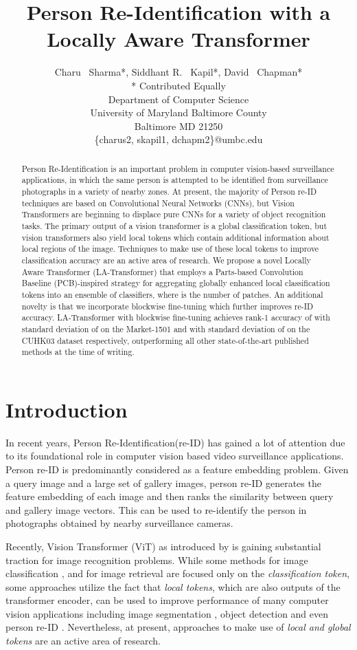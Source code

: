 \documentclass{article}
\title{Person Re-Identification with a Locally Aware Transformer}
\author{Charu ~Sharma*, Siddhant R. ~Kapil*, David ~Chapman* \\
  {*} Contributed Equally \\
  Department of Computer Science\\
  University of Maryland Baltimore County\\
  Baltimore MD 21250 \\
  \{charus2, skapil1, dchapm2\}@umbc.edu\\

}
\begin{document}
\maketitle

\begin{abstract}

 Person Re-Identification is an important problem in computer vision-based surveillance applications, in which the same person is attempted to be identified from surveillance photographs in a variety of nearby zones.  At present, the majority of Person re-ID techniques are based on Convolutional Neural Networks (CNNs), but Vision Transformers are beginning to displace pure CNNs for a variety of object recognition tasks. The primary output of a vision transformer is a global classification token, but vision transformers also yield local tokens which contain additional information about local regions of the image. Techniques to make use of these local tokens to improve classification accuracy are an active area of research. We propose a novel Locally Aware Transformer (LA-Transformer) that employs a Parts-based Convolution Baseline (PCB)-inspired strategy for aggregating globally enhanced local classification tokens into an ensemble of  classifiers, where  is the number of patches. An additional novelty is that we incorporate blockwise fine-tuning which further improves re-ID accuracy. LA-Transformer with blockwise fine-tuning achieves rank-1 accuracy of  with standard deviation of  on the Market-1501 and  with standard deviation of  on the CUHK03 dataset respectively, outperforming all other state-of-the-art published methods at the time of writing.
\end{abstract}

\section{Introduction}
In recent years, Person Re-Identification(re-ID) has gained a lot of attention due to its foundational role in computer vision based video surveillance applications. Person re-ID is predominantly considered as a feature embedding problem. Given a query image and a large set of gallery images, person re-ID generates the feature embedding of each image and then ranks the similarity between query and gallery image vectors. This can be used to re-identify the person in photographs obtained by nearby surveillance cameras.

Recently, Vision Transformer (ViT) as introduced by \citet{ViT} is gaining substantial traction for image recognition problems. While some methods for image classification \citep{ViT, Deit}, and for image retrieval \citep{VitImageRetrieval} are focused only on the \textit{classification token}, some approaches utilize the fact that \textit{local tokens}, which are also outputs of the transformer encoder, can be used to improve performance of many computer vision applications including image segmentation \citep{visualTransformer, pyramidVT, transunet}, object detection \citep{ transformerbased_obj_detection, pyramidVT} and even person re-ID \citep{TransReID}. Nevertheless, at present, approaches to make use of \textit{local and global tokens} are an active area of research.
\end{document}
